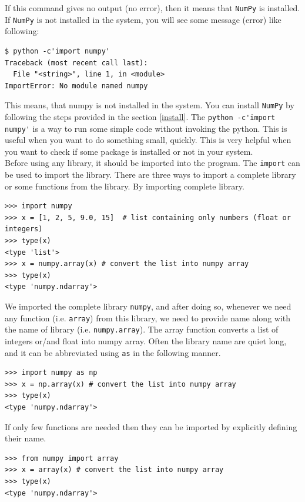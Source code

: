 \documentclass[10pt]{book}
\begin{document}
{If this command gives no output (no error), then it means that \verb"NumPy" is installed. If \verb"NumPy" is not installed in the system, you will see some message (error) like following:
\beforeverb
\begin{verbatim}
$ python -c'import numpy'
Traceback (most recent call last):
  File "<string>", line 1, in <module>
ImportError: No module named numpy
\end{verbatim} \afterverb

This means, that numpy is not installed in the system. You can install \verb"NumPy" by following the steps provided in the section \ref{install}. The \verb"python -c'import numpy'" is a way to run some simple code without invoking the python. This is useful when you want to do something small, quickly. This is very helpful when you want to check if some package is installed or not in your system. \\

Before using any library, it should be imported into the program. The \verb"import" can be used to import the library. There are three ways to import a complete library or some functions from the library. By importing complete library.
\beforeverb \begin{verbatim}
>>> import numpy
>>> x = [1, 2, 5, 9.0, 15]  # list containing only numbers (float or integers)
>>> type(x)
<type 'list'>
>>> x = numpy.array(x) # convert the list into numpy array
>>> type(x)
<type 'numpy.ndarray'>
\end{verbatim} \afterverb
We imported the complete library \verb"numpy", and after doing so, whenever we need any function (i.e. \verb"array") from this library, we need to provide name along with the name of library (i.e. \verb"numpy.array"). The array function converts a list of integers or/and float into numpy array. Often the library name are quiet long, and it can be abbreviated using \verb"as" in the following manner. 
\beforeverb \begin{verbatim}
>>> import numpy as np
>>> x = np.array(x) # convert the list into numpy array
>>> type(x)
<type 'numpy.ndarray'>
\end{verbatim} \afterverb

If only few functions are needed then they can be imported by explicitly defining their name. 
\beforeverb \begin{verbatim}
>>> from numpy import array
>>> x = array(x) # convert the list into numpy array
>>> type(x) 
<type 'numpy.ndarray'>
\end{verbatim} \afterverb

}
\end{document}
